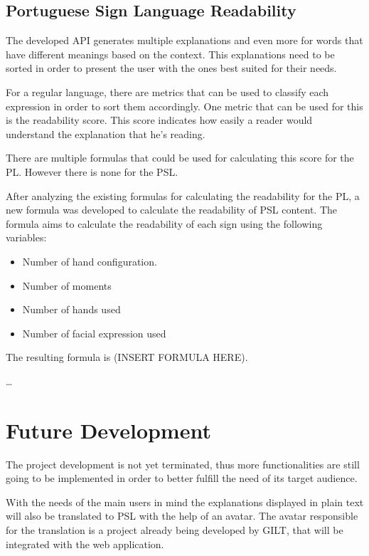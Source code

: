 \documentclass[runningheads]{llncs}
\begin{document}
\subsection{Portuguese Sign Language Readability}

The developed API generates multiple explanations and even more for words that have different meanings based on the context.
This explanations need to be sorted in order to present the user with the ones best suited for their needs.

For a regular language, there are metrics that can be used to classify each expression in order to sort them accordingly.
One metric that can be used for this is the readability score.
This score indicates how easily a reader would understand the explanation that he's reading.

There are multiple formulas that could be used for calculating this score for the PL.
However there is none for the PSL.

After analyzing the existing formulas for calculating the readability for the PL, a new formula was developed to calculate the readability of PSL content.
The formula aims to calculate the readability of each sign using the following variables:

\begin{itemize}
    \item Number of hand configuration.
    \item Number of moments
    \item Number of hands used
    \item Number of facial expression used
\end{itemize}

The resulting formula is (INSERT FORMULA HERE).

\dots

\section{Future Development}

The project development is not yet terminated, thus more functionalities are still going to be implemented in order to better fulfill the need of its target audience.

With the needs of the main users in mind the explanations displayed in plain text will also be translated to PSL with the help of an avatar.
The avatar responsible for the translation is a project already being developed by GILT, that will be integrated with the web application.
\end{document}
